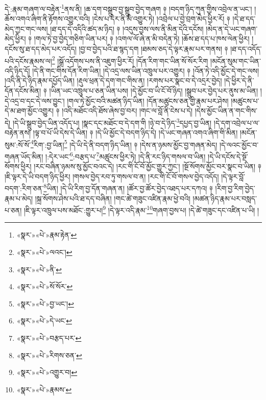 དེ་:རྣམ་གཞག་ལ་བརྟེན་\footnote{«སྣར་»«པེ་»རྣམ་རྟེན་}ནས་ནི། །ཆ་དག་བསྒྲུབ་བྱ་སྒྲུབ་བྱེད་གཞག ༈ །བདག་ཉིད་ཀུན་གྱིས་འབྲེལ་ན་ཡང་། །ཆོས་འགའ་ཞིག་ནི་རྟོགས་འགྱུར་བའི། །ངེས་པ་དེར་ནི་མི་འགྱུར་ཏེ། །འབྲེལ་པ་བྱེ་བྲག་མེད་ཕྱིར་རོ། ༈ །དེ་ཐ་དད་མེད་ཀྱང་གང་ལས། །ཐ་དད་དེ་འདིའི་ཚད་མ་ཉིད། ༈ །འདུས་བྱས་ལས་ནི་མིན་དེའི་དངོས། །མེད་ན་དེ་ཡང་གཞག་མེད་ཕྱིར། ༈ །གལ་ཏེ་བྱ་བྱེད་གཅིག་ཡིན་པར། ༈ །འགལ་ལོ་ཞེ་ན་མི་བདེན་ཏེ། །ཆོས་ཐ་དད་པ་ཁས་ལེན་ཕྱིར། །དངོས་སུ་ཐ་དད་མེད་པར་འདོད། །བྱ་བ་བྱེད་པའི་ཐ་སྙད་དག །ཐམས་ཅད་དེ་ལྟར་རྣམ་པར་གནས། ༈ །ཐ་དད་འདོད་པའི་དངོས་རྣམས་ལ།\footnote{«སྣར་»«པེ་»ལའང་།} །སྒྲོ་འདོགས་པས་ནི་འཇུག་ཕྱིར་རོ། །དོན་རིག་གང་ཡིན་སོ་སོར་རིག །མངོན་སུམ་གང་ཡིན་འདི་ཉིད་དོ། །དེ་ནི་གང་གིས་དོན་རིག་ཡིན། །དེ་འདྲ་ལས་ཡིན་འཁྲུལ་པར་འགྱུར། ༈ །འོན་ཏེ་འདི་མྱོང་དེ་གང་ལས། །འདི་ནི་དེ་ཉིད་རྣམ་དཔྱོད་ཡིན། །རྡུལ་ཕྲན་དེ་དག་གང་གིས་ན། །རགས་པར་སྣང་བ་དེ་འདྲར་བྱེད། །དེ་ཕྱིར་དེ་ནི་དོན་དངོས་མིན། ༈ །ཡིན་ཡང་འཁྲུལ་པ་ཅན་ཡིན་པས། །དེ་མྱོང་བ་ཡི་ངོ་བོ་ཉིད། །སྒྲུབ་པར་བྱེད་པར་ནུས་མ་ཡིན། །དེ་འདྲ་བ་དང་དེ་ལས་བྱུང་། །གལ་ཏེ་མྱོང་བའི་མཚན་ཉིད་ཡིན། །དོན་མཚུངས་ཅན་གྱི་རྣམ་པར་ཤེས། །མཚུངས་པ་དེ་མ་ཐག་མྱོང་འགྱུར། ༈ །འདི་མཐོང་འདི་ཐོས་ཞེས་བྱ་བར། །གང་ལ་བློ་ནི་ངེས་པ་དེ། །དེས་མྱོང་ཡིན་ན་གང་གིས་དེ། །དེ་ཡི་སྒྲུབ་བྱེད་ཡིན་འདོད་པ། །སྣང་དང་མཐོང་བ་དེ་དག་གི །ཉེ་བ་དེ་ཉིད་\footnote{«སྣར་»«པེ་»ནི་}དཔྱད་བྱ་ཡིན། །དེ་དག་འབྲེལ་པ་ལ་བརྟེན་ནས། །ལྟ་བ་པོ་ཡི་དེས་དེ་ཡིན། ༈ །དེ་ཡི་མྱོང་དེ་བདག་ཉིད་དེ། །དེ་ཡང་གཞན་འགའ་ཞིག་གི་མིན། །མངོན་སུམ་:སོ་སོ་\footnote{«སྣར་»«པེ་»སོ་སོར་}རིག་:བྱ་ཡིན།\footnote{«སྣར་»«པེ་»བྱ་ཡང་།} །དེ་ཡི་དེ་ནི་བདག་ཉིད་ཡིན། ༈ །དེས་ན་ཉམས་མྱོང་བྱ་གཞན་མེད། །དེ་ལའང་མྱོང་བ་གཞན་ཡོད་མིན། །:དེར་ཡང་\footnote{«སྣར་»«པེ་»དེ་ཡང་}:བརྩད་པ་\footnote{«སྣར་»«པེ་»བརྩད་པར་}མཚུངས་ཕྱིར་ཏེ། །དེ་ནི་རང་ཉིད་གསལ་བ་ཡིན། །དེ་ཡི་དངོས་དེ་སྔོ་སོགས་ཕྱིར། །རང་བཞིན་ཉམས་སུ་མྱོང་བའང་དེ། །རང་གི་ངོ་བོ་མྱོང་གྱུར་ཀྱང་། །སྔོ་སོགས་མྱོང་བར་སྣང་བ་ཡིན། ༈ །ཇི་ལྟར་དེ་ཡི་བདག་ཉིད་ཕྱིར། །གསལ་བྱེད་རབ་ཏུ་གསལ་བ་ན། །རང་གི་ངོ་བོ་གསལ་བྱེད་འདོད། །དེ་ལྟར་བློ་བདག་:རིག་ཅན་\footnote{«སྣར་»«པེ་»རིགས་ཅན་}ཡིན། །དེ་ཡི་རིག་བྱ་དོན་གཞན་ན། །ཚོར་བྱ་ཚོར་བྱེད་འཐད་པར་དཀའ། ༈ །རིག་བྱ་རིག་བྱེད་རྣམ་པ་མེད། །སྐྲ་སོགས་ཤེས་པའི་ཐ་དད་བཞིན། །གང་ཚེ་གཟུང་འཛིན་རྣམ་ཕྱེ་བའི། །མཚན་ཉིད་རྣམ་པར་བསླད་པ་ཅན། །ཇི་ལྟར་འཁྲུལ་པས་མཐོང་:གྱུར་པ།\footnote{«སྣར་»«པེ་»འགྱུར་བ།} །དེ་ལྟར་འདི་རྣམ་\footnote{«སྣར་»«པེ་»རྣམས་}གཞག་བྱས་པ། །དེ་ཚེ་གཟུང་དང་འཛིན་པ་ཡི། །
